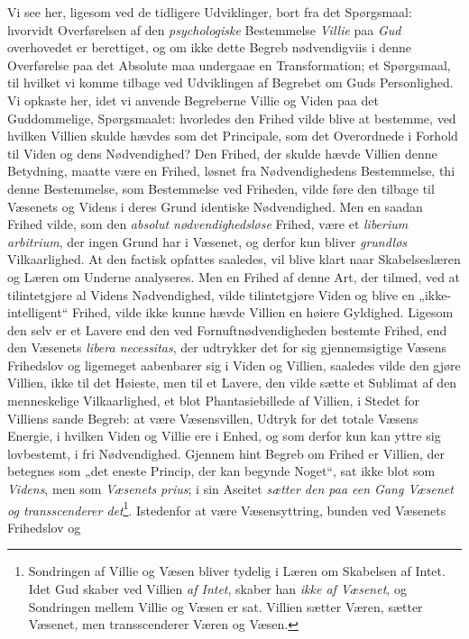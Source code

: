 \documentclass[12pt,a4paper]{book}
\newcommand{\opage}[1]{\marginnote{\footnotesize\textit{[#1]}}}
\begin{document}
Vi see her, ligesom ved de tidligere Udviklinger, bort fra det Spørgsmaal: hvorvidt
Overførelsen af den \emph{psychologiske} Bestemmelse \emph{Villie} paa \emph{Gud} overhovedet er
berettiget, og om ikke dette Begreb nødvendigviis i denne Overførelse paa det
Absolute maa undergaae en Transformation; et Spørgsmaal, til hvilket vi komme
tilbage ved Udviklingen af Begrebet om Guds Personlighed. Vi opkaste her, idet vi
anvende Begreberne Villie og Viden paa det Guddommelige, Spørgsmaalet: hvorledes
den Frihed vilde blive at bestemme, ved hvilken Villien skulde hævdes som det
Principale, som det Overordnede i Forhold til Viden og dens Nødvendighed? Den
Frihed, der skulde hævde Villien denne Betydning, maatte være en Frihed, løsnet fra
Nødvendighedens Bestemmelse, thi denne Bestemmelse, som Bestemmelse ved Friheden,
vilde føre den \opage{65}tilbage til Væsenets og Videns i deres Grund identiske Nødvendighed.
Men en saadan Frihed vilde, som den \emph{absolut nødvendighedsløse} Frihed, være
et \emph{\textit{liberium arbitrium}}, der ingen Grund har i Væsenet, og derfor kun bliver \emph{grundløs} Vilkaarlighed. At den factisk opfattes saaledes, vil blive klart naar
Skabelseslæren og Læren om Underne analyseres. Men en Frihed af denne Art, der
tilmed, ved at tilintetgjøre al Videns Nødvendighed, vilde tilintetgjøre Viden og
blive en „ikke-intelligent“ Frihed, vilde ikke kunne hævde Villien en høiere
Gyldighed. Ligesom den selv er et Lavere end den ved Fornuftnødvendigheden bestemte
Frihed, end den Væsenets \textit{libera necessitas}, der udtrykker det for sig
gjennemsigtige Væsens Frihedslov og ligemeget aabenbarer sig i Viden og Villien,
saaledes vilde den gjøre Villien, ikke til det Høieste, men til et Lavere, den
vilde sætte et Sublimat af den menneskelige Vilkaarlighed, et blot Phantasiebillede
af Villien, i Stedet for Villiens sande Begreb: at være Væsensvillen, Udtryk for
det totale Væsens Energie, i hvilken Viden og Villie ere i Enhed, og som derfor kun
kan yttre sig lovbestemt, i fri Nødvendighed.
Gjennem hint Begreb om Frihed er Villien, der betegnes som „det eneste Princip, der
kan begynde Noget“, sat ikke blot som \emph{Videns}, men som \emph{Væsenets} \textit{prius}; i
sin Aseitet \emph{sætter den paa een Gang Væsenet og transscenderer det}\footnote{Sondringen
af Villie og Væsen bliver tydelig i Læren om Skabelsen af Intet. Idet Gud skaber
ved Villien \emph{af Intet}, skaber han \emph{ikke af Væsenet}, og Sondringen mellem Villie og
Væsen er sat. Villien sætter Væren, sætter Væsenet, men transscenderer Væren og
Væsen.}. Istedenfor at være Væsensyttring, bunden ved Væsenets Frihedslov og
\end{document}
